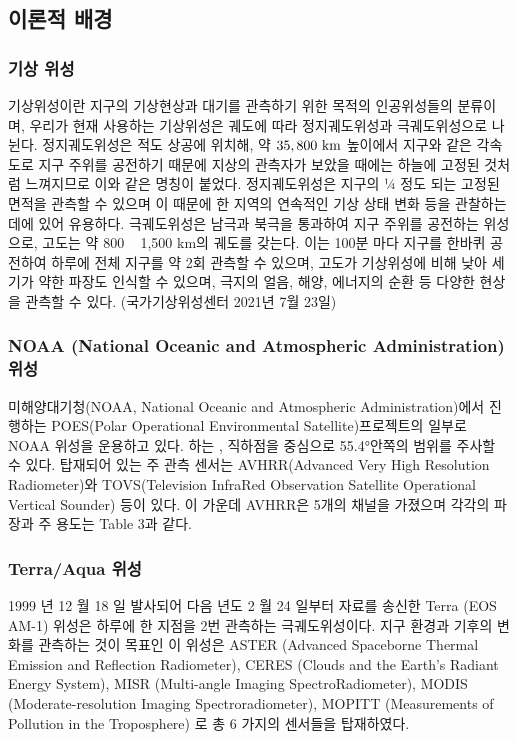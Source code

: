 \subsection{이론적 배경}

\subsubsection{기상 위성}

기상위성이란 지구의 기상현상과 대기를 관측하기 위한 목적의 인공위성들의 분류이며, 우리가 현재 사용하는 기상위성은 궤도에 따라 정지궤도위성과 극궤도위성으로 나뉜다. 정지궤도위성은 적도 상공에 위치해, 약 $35,800 ~\rm{km}$ 높이에서 지구와 같은 각속도로 지구 주위를 공전하기 때문에 지상의 관측자가 보았을 때에는 하늘에 고정된 것처럼 느껴지므로 이와 같은 명칭이 붙었다. 정지궤도위성은 지구의 ¼ 정도 되는 고정된 면적을 관측할 수 있으며 이 때문에 한 지역의 연속적인 기상 상태 변화 등을 관찰하는 데에 있어 유용하다. 극궤도위성은 남극과 북극을 통과하여 지구 주위를 공전하는 위성으로, 고도는 약 800 ~ 1,500 km의 궤도를 갖는다. 이는 100분 마다 지구를 한바퀴 공전하여 하루에 전체 지구를 약 2회 관측할 수 있으며, 고도가 기상위성에 비해 낮아 세기가 약한 파장도 인식할 수 있으며, 극지의 얼음, 해양, 에너지의 순환 등 다양한 현상을 관측할 수 있다. (국가기상위성센터 2021년 7월 23일)

\subsubsection{NOAA (National Oceanic and Atmospheric Administration) 위성}

미해양대기청(NOAA, National Oceanic and Atmospheric Administration)에서 진행하는 POES(Polar Operational Environmental Satellite)프로젝트의 일부로 NOAA 위성을 운용하고 있다. 하는 , 직하점을 중심으로 55.4°안쪽의 범위를 주사할 수 있다. 탑재되어 있는 주 관측 센서는 AVHRR(Advanced Very High Resolution Radiometer)와 TOVS(Television InfraRed Observation Satellite Operational Vertical Sounder) 등이 있다. 이 가운데 AVHRR은 5개의 채널을 가졌으며 각각의 파장과 주 용도는 Table 3과 같다.

\subsubsection{Terra/Aqua 위성}

1999 년 12 월 18 일 발사되어 다음 년도 2 월 24 일부터 자료를 송신한 Terra (EOS AM-1) 위성은 하루에 한 지점을 2번 관측하는 극궤도위성이다. 지구 환경과 기후의 변화를 관측하는 것이 목표인 이 위성은 ASTER (Advanced Spaceborne Thermal Emission and Reflection Radiometer), CERES (Clouds and the Earth's Radiant Energy System), MISR (Multi-angle Imaging SpectroRadiometer), MODIS (Moderate-resolution Imaging Spectroradiometer), MOPITT (Measurements of Pollution in the Troposphere) 로 총 6 가지의 센서들을 탑재하였다. 


